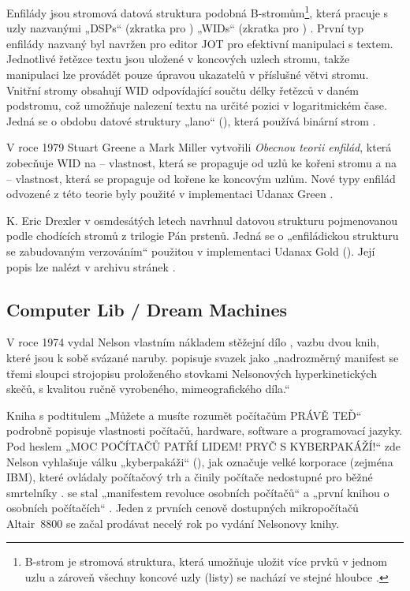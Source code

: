 Enfilády jsou stromová datová struktura podobná B-stromům\footnote{B-strom je stromová struktura, která umožňuje uložit více prvků v jednom uzlu a zároveň všechny koncové uzly (listy) se nachází ve stejné hloubce \autocite{wiki:B-Tree}.},
která pracuje s uzly nazvanými „DSPs“ (zkratka pro ) „WIDs“ (zkratka pro ) \autocite{SunlessSea2005}. První typ enfilády nazvaný  byl navržen pro editor JOT pro efektivní manipulaci s textem. Jednotlivé řetězce textu jsou uložené v koncových uzlech stromu, takže manipulaci lze provádět pouze úpravou ukazatelů v příslušné větvi stromu. Vnitřní stromy obsahují WID odpovídající součtu délky řetězců v daném podstromu, což umožňuje nalezení textu na určité pozici v logaritmickém čase. Jedná se o obdobu datové struktury „lano“ (), která používá binární strom \autocite{wiki:Enfilade}.

\label{p:enf:gen}
V roce 1979 Stuart Greene a Mark Miller vytvořili \emph{Obecnou teorii enfilád}, která zobecňuje WID na  -- vlastnost, která se propaguje od uzlů ke kořeni stromu a  na  -- vlastnost, která se propaguje od kořene ke koncovým uzlům. Nové typy enfilád odvozené z této teorie byly použité v implementaci Udanax Green \autocite{xutech}.

\label{p:enf:ent}
K. Eric Drexler v osmdesátých letech navrhnul datovou strukturu  pojmenovanou podle chodících stromů z trilogie Pán prstenů. Jedná se o „enfiládickou strukturu se zabudovaným verzováním“ \autocite{Nelson1999b} použitou v implementaci Udanax Gold (). Její popis lze nalézt v archivu stránek \textcite{SunlessSea:Ent}.

\subsection{Computer Lib / Dream Machines}

V roce 1974 vydal Nelson vlastním nákladem stěžejní dílo , vazbu dvou knih, které jsou k sobě svázané naruby. \Textcite[212]{Wright2007} popisuje svazek jako „nadrozměrný manifest se třemi sloupci strojopisu proloženého stovkami Nelsonových hyperkinetických skečů, s kvalitou ručně vyrobeného, mimeografického díla.“

Kniha  s podtitulem „Můžete a musíte rozumět počítačům PRÁVĚ TEĎ“ podrobně popisuje vlastnosti počítačů, hardware, software a programovací jazyky. Pod heslem „MOC POČÍTAČŮ PATŘÍ LIDEM! PRYČ S KYBERPAKÁŽÍ!“ zde Nelson vyhlašuje válku „kyberpakáži“ (), jak označuje velké korporace (zejména IBM), které ovládaly počítačový trh a činily počítače nedostupné pro běžné smrtelníky \autocite[261]{Markoff2005}.  se stal „manifestem revoluce osobních počítačů“ \autocite[1]{Rheingold1985} a „první knihou o osobních počítačích“ \autocite[301]{Wardrip-Fruin2003}. Jeden z prvních cenově dostupných mikropočítačů Altair~8800 se začal prodávat necelý rok po vydání Nelsonovy knihy.

